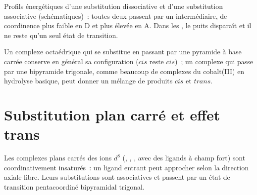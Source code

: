 \begin{omfigure}

{\small Profils énergétiques d'une substitution dissociative et d'une
substitution associative (schématiques)~: toutes deux passent par un
intermédiaire, de coordinence plus faible en D et plus élevée en A. Dans les
, le puits disparaît et il ne reste qu'un seul état de
transition.}
\end{omfigure}

Un complexe octaédrique qui se substitue en passant par une pyramide à base
carrée conserve en général sa configuration ($cis$ reste $cis$)~; un
complexe qui passe par une bipyramide trigonale, comme beaucoup de
complexes du cobalt(III) en hydrolyse basique, peut donner un mélange de
produits $cis$ et $trans$.

\section{Substitution plan carré et effet trans}

Les complexes plans carrés des ions $d^8$ (, , ,  avec des ligands à champ fort)
sont coordinativement insaturés~: un ligand entrant peut approcher selon la
direction axiale libre. Leurs substitutions sont associatives et passent par
un état de transition pentacoordiné bipyramidal trigonal.

